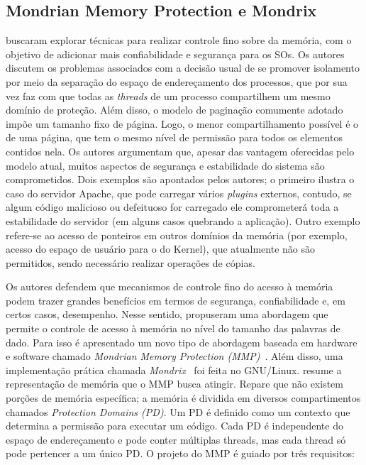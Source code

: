 \subsection{Mondrian Memory Protection e Mondrix}

\citet{mmp} buscaram explorar técnicas para realizar controle fino sobre da
memória, com o objetivo de adicionar mais confiabilidade e segurança para os
SOs. Os autores discutem os problemas associados com a decisão usual de se promover
isolamento por meio da separação do espaço de endereçamento dos processos, que
por sua vez faz com que todas as \emph{threads} de um processo compartilhem um
mesmo domínio de proteção. Além disso, o modelo de paginação comumente adotado impõe um
tamanho fixo de página. Logo, o menor compartilhamento possível é o de uma página, que
tem o mesmo nível de permissão para todos os elementos contidos nela. Os autores
argumentam que, apesar das vantagem oferecidas pelo modelo atual, muitos
aspectos de segurança e estabilidade do sistema são comprometidos. Dois
exemplos são apontados pelos autores; o primeiro ilustra o caso do servidor
Apache, que pode carregar vários \textit{plugins} externos, contudo, se algum
código malicioso ou defeituoso for carregado ele comprometerá toda a
estabilidade do servidor (em alguns casos quebrando a aplicação). Outro exemplo
refere-se ao acesso de ponteiros em outros domínios da memória (por exemplo,
acesso do espaço de usuário para o do Kernel), que atualmente não são permitidos,
sendo necessário realizar operações de cópias.


Os autores defendem que mecanismos de controle fino do acesso à memória podem
trazer grandes benefícios em termos de segurança, confiabilidade e, em certos
casos, desempenho. Nesse sentido, \citet{mmp} propuseram uma abordagem
que permite o controle de acesso à memória no nível do tamanho das palavras de
dado. Para isso é apresentado um novo tipo de abordagem baseada em hardware e
software chamado \emph{Mondrian Memory Protection (MMP)}~\citep{mmp}. Além
disso, uma implementação prática chamada \emph{Mondrix}~\cite{mondrix} foi
feita no GNU/Linux.  resume a representação de memória que o MMP
busca atingir. Repare que não existem porções de memória específica; a
memória é dividida em diversos compartimentos chamados \emph{Protection
Domains (PD)}. Um PD é definido como um contexto que determina a permissão para
executar um código. Cada PD é independente do espaço de endereçamento e
pode conter múltiplas threads, mas cada thread só pode pertencer a um único PD.
O projeto do MMP é guiado por três requisitos:

